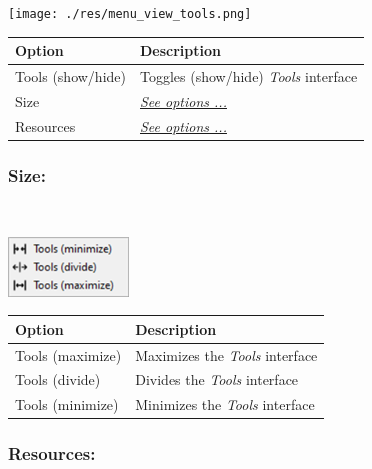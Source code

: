\texttt{[image: ./res/menu\_view\_tools.png]}\\

\begin{scriptsize}
  \begin{tabularx}{\textwidth}{>{\hsize=0.3\hsize}X>{\hsize=0.7\hsize}X}\\
    \hline
    \textbf{Option} & \textbf{Description} \\
    \hline
    Tools (show/hide) & Toggles (show/hide) \textit{Tools} interface \\
    \hdashline[1pt/1pt]
    Size & \textit{\href{\#menu\_view\_tools\_size}{See options ...}} \\
    \hdashline[1pt/1pt]
    Resources & \textit{\href{\#menu\_view\_tools\_resources}{See options ...}} \\
    \hline
  \end{tabularx}
\end{scriptsize}


\hypertarget{menu_view_tools_size}{}
\subsubsection{Size:}\\

\includegraphics[scale=0.50]{./res/menu_view_tools_size.png}\\

\begin{scriptsize}
  \begin{tabularx}{\textwidth}{>{\hsize=0.3\hsize}X>{\hsize=0.7\hsize}X}\\
    \hline
    \textbf{Option} & \textbf{Description} \\
    \hline
    Tools (maximize) & Maximizes the \textit{Tools} interface \\
    Tools (divide) & Divides the \textit{Tools} interface \\
    Tools (minimize) & Minimizes the \textit{Tools} interface \\
    \hline
  \end{tabularx}
\end{scriptsize}


\hypertarget{menu_view_tools_resources}{}
\subsubsection{Resources:}\\

